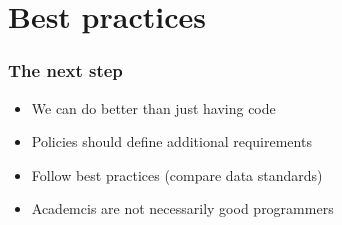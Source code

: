 \documentclass[slidestop]{beamer}
\begin{document}
\section*{}


\section{Best practices}

{
  \frame{}
}

\begin{frame}
  \frametitle{The next step}
  \begin{itemize}
    \item We can do better than just having code
    \item Policies should define additional requirements
    \item Follow best practices (compare data standards)
    \item Academcis are not necessarily good programmers
  \end{itemize}
\end{frame}

{
  \frame{}
}
\end{document}
